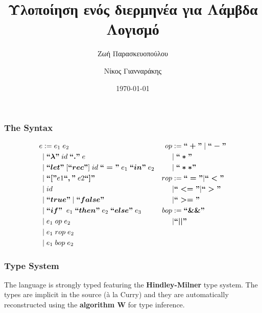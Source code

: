 \documentclass[xcolor=table]{beamer}
\title[The Jebus Lambda Calculus Interpreter]{Υλοποίηση ενός διερμηνέα για Λάμβδα Λογισμό}
\author{Ζωή Παρασκευοπούλου \\ \and Νίκος Γιανναράκης  }
\institute[]
{
Σχολή Ηλεκτρολόγων Μηχανικών και Μηχανικών Υπολογιστών\\
Εθνικό Μετσόβιο Πολυτεχνείο
}
\date{\today}
\newcommand{\bs}[1]{\boldsymbol{#1}}
\begin{document}
\begin{frame}
\titlepage
\end{frame}


\begin{frame}
\frametitle{The Syntax}
\begin{block}
{
\begin{small}
\begin{align*}
e & := e_1 \; e_2 																		                                  & op &:= \bs{``+"}\; | \; \bs{``-"}  \\
   & | \; \bs{``\lambda"} \; id \; \bs{`` ."} \; e 										                  &        & |\; \bs{``*"} \; 	  \\
   & | \; \bs{``let"} \; [\bs{``rec"}] \; id \; \bs{``="} \; e_1 \; \bs{``in"} \; e_2 		  & 		& | \; \bs{``**"}		              \\
   & | \;  \bs{``["}e1\bs{``,"} \; e2\bs{``]"} 													              & rop & := \bs{``="} | \bs{``<"}\\
   & | \;  id 																			 	                                  & 		& | \bs{``<="} | \bs{``>"}\\
   & | \;  \bs{``true"}\; | \;\bs{``false"} 													                  &		& | \bs{``>="} \\
   & | \; \bs{``if"}\; \; e_1\; \bs{``then"}\; e_2\; \bs{``else"}\; e_3    & bop & := \bs{``\&\&"} \\
   & | \; e_1 \; op \; e_2                                                                                         &             & | \bs{``||"} \\
   & | \; e_1 \; rop \; e_2                                                                                          & \\
   & | \; e_1 \; bop \; e_2
\end{align*}
\end{small}

}

\end{block}
\end{frame}

%


\begin{frame}
\frametitle{Type System}
\begin{block}
{
The language is strongly typed featuring the \textbf{Hindley-Milner} type system. The types are implicit in the source (à la Curry) and they are automatically reconstructed using the \textbf{algorithm W} for type inference.
}
\end{block}


\end{frame}
\end{document}
